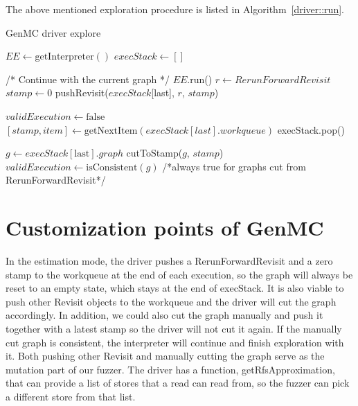 
The above mentioned exploration procedure is listed in Algorithm~\ref{driver::run}.

\begin{algorithm}
	\caption{GenMC driver explore}
	\label{driver::run}
	\begin{algorithmic}[1]
		\STATE $EE \leftarrow \text{getInterpreter}()$
		\STATE $execStack \leftarrow []$

		\STATE /* Continue with the current graph */
		\STATE $EE$.run()
		\STATE $r \leftarrow RerunForwardRevisit$
		\STATE $stamp \leftarrow 0$
		\STATE pushRevisit($execStack$[last], $r$, $stamp$)

		\STATE $validExecution \leftarrow \text{false}$
		\STATE $[{stamp}, {item}] \leftarrow \text{getNextItem}(execStack[last].workqueue)$
		\STATE execStack.pop()
		\STATE {}
		\ELSE
		\RETURN
		\ENDIF

		\ELSE
		\STATE $g \leftarrow execStack[\text{last}].graph$
		\STATE cutToStamp($g$, $stamp$)
		\STATE $validExecution \leftarrow \text{isConsistent}(g)$   /*always true for graphs cut from RerunForwardRevisit*/
		\ENDIF
		\ENDWHILE
		\ENDWHILE
	\end{algorithmic}
\end{algorithm}





\section{Customization points of GenMC}

In the estimation mode, the driver pushes a RerunForwardRevisit and a zero stamp to the workqueue at the end of each execution, so the graph will always be reset to an empty state, which stays at the end of execStack. It is also viable to push other Revisit objects to the workqueue and the driver will cut the graph accordingly. In addition, we could also cut the graph manually and push it together with a latest stamp so the driver will not cut it again. If the manually cut graph is consistent, the interpreter will continue and finish exploration with it. Both pushing other Revisit and manually cutting the graph serve as the mutation part of our fuzzer. The driver has a function, getRfsApproximation, that can provide a list of stores that a read can read from, so the fuzzer can pick a different store from that list.

